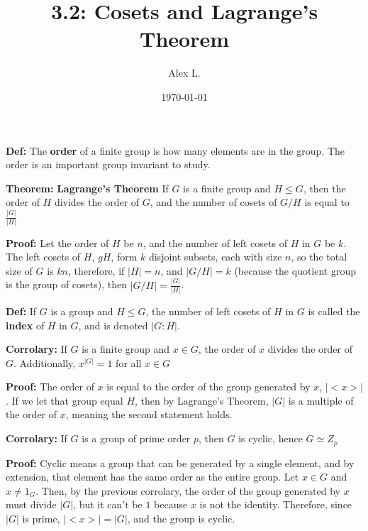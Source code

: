 \documentclass{article}
\title{3.2: Cosets and Lagrange's Theorem}
\author{Alex L.}
\date{\today}
\begin{document}
\maketitle

\textbf{Def:} The \textbf{order} of a finite group is how many elements are in the group. The order is an important group invariant to study.

\textbf{Theorem:} \textbf{Lagrange's Theorem} If $G$ is a finite group and $H \leq G$, then the order of $H$ divides the order of $G$, and the number of cosets of $G/H$ is equal to $\frac{\vert G \vert}{\vert H \vert}$

\textbf{Proof:} Let the order of $H$ be $n$, and the number of left cosets of $H$ in $G$ be $k$. The left cosets of $H$, $gH$, form $k$ disjoint subsets, each with size $n$, so the total size of $G$ is $kn$, therefore, if $\vert H \vert = n$, and $\vert G/H \vert = k$ (because the quotient group is the group of cosets), then $\vert G/H \vert = \frac{\vert G\vert}{\vert H\vert}$.

\textbf{Def:} If $G$ is a group and $H \leq G$, the number of left cosets of $H$ in $G$ is called the \textbf{index} of $H$ in $G$, and is denoted $\vert G:H\vert$.

\textbf{Corrolary:} If $G$ is a finite group and $x \in G$, the order of $x$ divides the order of $G$. Additionally, $x^{\vert G\vert} = 1$ for all $x \in G$

\textbf{Proof:} The order of $x$ is equal to the order of the group generated by $x$, $\vert <x> \vert$. If we let that group equal $H$, then by Lagrange's Theorem, $\vert G \vert$ is a multiple of the order of $x$, meaning the second statement holds.

\textbf{Corrolary:} If $G$ is a group of prime order $p$, then $G$ is cyclic, hence $G \simeq Z_p$

\textbf{Proof:} Cyclic means a group that can be generated by a single element, and by extension, that element has the same order as the entire group. Let $x \in G$ and $x \neq 1_G$. Then, by the previous corrolary, the order of the group generated by $x$ must divide $\vert G\vert$, but it can't be $1$ because $x$ is not the identity. Therefore, since $\vert G \vert$ is prime, $\vert <x> \vert = \vert G \vert$, and the group is cyclic. 
\end{document}
